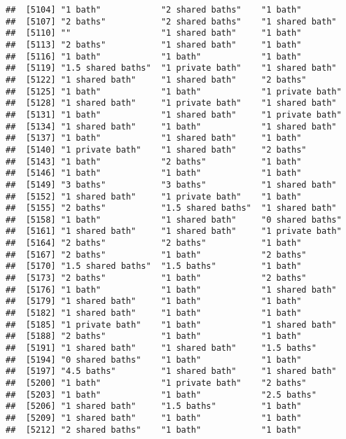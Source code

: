 \documentclass[
]{article}
\begin{document}
\begin{verbatim}
##  [5104] "1 bath"            "2 shared baths"    "1 bath"           
##  [5107] "2 baths"           "2 shared baths"    "1 shared bath"    
##  [5110] ""                  "1 shared bath"     "1 bath"           
##  [5113] "2 baths"           "1 shared bath"     "1 bath"           
##  [5116] "1 bath"            "1 bath"            "1 bath"           
##  [5119] "1.5 shared baths"  "1 private bath"    "1 shared bath"    
##  [5122] "1 shared bath"     "1 shared bath"     "2 baths"          
##  [5125] "1 bath"            "1 bath"            "1 private bath"   
##  [5128] "1 shared bath"     "1 private bath"    "1 shared bath"    
##  [5131] "1 bath"            "1 shared bath"     "1 private bath"   
##  [5134] "1 shared bath"     "1 bath"            "1 shared bath"    
##  [5137] "1 bath"            "1 shared bath"     "1 bath"           
##  [5140] "1 private bath"    "1 shared bath"     "2 baths"          
##  [5143] "1 bath"            "2 baths"           "1 bath"           
##  [5146] "1 bath"            "1 bath"            "1 bath"           
##  [5149] "3 baths"           "3 baths"           "1 shared bath"    
##  [5152] "1 shared bath"     "1 private bath"    "1 bath"           
##  [5155] "2 baths"           "1.5 shared baths"  "1 shared bath"    
##  [5158] "1 bath"            "1 shared bath"     "0 shared baths"   
##  [5161] "1 shared bath"     "1 shared bath"     "1 private bath"   
##  [5164] "2 baths"           "2 baths"           "1 bath"           
##  [5167] "2 baths"           "1 bath"            "2 baths"          
##  [5170] "1.5 shared baths"  "1.5 baths"         "1 bath"           
##  [5173] "2 baths"           "1 bath"            "2 baths"          
##  [5176] "1 bath"            "1 bath"            "1 shared bath"    
##  [5179] "1 shared bath"     "1 bath"            "1 bath"           
##  [5182] "1 shared bath"     "1 bath"            "1 bath"           
##  [5185] "1 private bath"    "1 bath"            "1 shared bath"    
##  [5188] "2 baths"           "1 bath"            "1 bath"           
##  [5191] "1 shared bath"     "1 shared bath"     "1.5 baths"        
##  [5194] "0 shared baths"    "1 bath"            "1 bath"           
##  [5197] "4.5 baths"         "1 shared bath"     "1 shared bath"    
##  [5200] "1 bath"            "1 private bath"    "2 baths"          
##  [5203] "1 bath"            "1 bath"            "2.5 baths"        
##  [5206] "1 shared bath"     "1.5 baths"         "1 bath"           
##  [5209] "1 shared bath"     "1 bath"            "1 bath"           
##  [5212] "2 shared baths"    "1 bath"            "1 bath"           

\end{verbatim}
\end{document}
